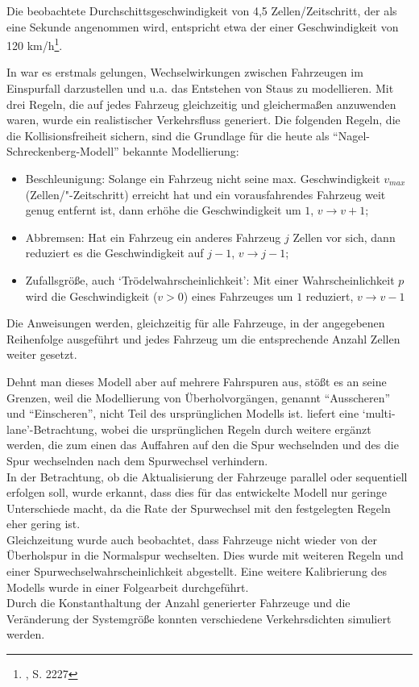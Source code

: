 Die beobachtete Durchschittsgeschwindigkeit von 4,5 Zellen/Zeitschritt, der als eine Sekunde angenommen wird, entspricht etwa der einer Geschwindigkeit von 120 km/h\footnote{\cite{na-sch}, S. 2227}. 

In \cite{na-sch} war es erstmals gelungen, Wechselwirkungen zwischen Fahrzeugen im Einspurfall darzustellen %
und u.a. das Entstehen von Staus zu modellieren. 
Mit drei Regeln, die auf jedes Fahrzeug gleichzeitig und gleichermaßen anzuwenden waren, wurde ein realistischer Verkehrsfluss generiert. 
Die folgenden Regeln, die die Kollisionsfreiheit sichern, sind die Grundlage für die heute als \enquote{Nagel-Schreckenberg-Modell} bekannte Modellierung: 

\begin{itemize}
\item Beschleunigung: Solange ein Fahrzeug nicht seine max. Geschwindigkeit $v_{max}$ (Zellen/"-Zeitschritt) erreicht hat und ein vorausfahrendes Fahrzeug weit genug entfernt ist, dann erhöhe die Geschwindigkeit um $1$, $v \rightarrow v+1$;
\item Abbremsen: Hat ein Fahrzeug ein anderes Fahrzeug $j$ Zellen vor sich, dann reduziert es die Geschwindigkeit auf $j-1$, $v \rightarrow j-1$;
\item Zufallsgröße, auch \enquote*{Trödelwahrscheinlichkeit}: Mit einer Wahrscheinlichkeit $p$ wird die Geschwindigkeit ($v > 0$) eines Fahrzeuges um $1$ reduziert, $v \rightarrow v-1$
\end{itemize}

Die Anweisungen werden, gleichzeitig für alle Fahrzeuge, in der angegebenen Reihenfolge ausgeführt und jedes Fahrzeug um die entsprechende Anzahl Zellen weiter gesetzt.

Dehnt man dieses Modell aber auf mehrere Fahrspuren aus, stößt es an seine Grenzen, weil die Modellierung von Überholvorgängen, genannt \enquote{Ausscheren} und \enquote{Einscheren}, nicht Teil des ursprünglichen Modells ist. 
\cite{multi-lane} liefert eine \enquote*{multi-lane}-Betrachtung, wobei die ursprünglichen Regeln durch weitere ergänzt werden, die zum einen das Auffahren auf den die Spur wechselnden und des die Spur wechselnden nach dem Spurwechsel verhindern. \\
In der Betrachtung, ob die Aktualisierung der Fahrzeuge parallel oder sequentiell erfolgen soll, wurde erkannt, dass dies für das entwickelte Modell nur geringe Unterschiede macht, da die Rate der Spurwechsel mit den festgelegten Regeln eher gering ist. \\
Gleichzeitung wurde auch beobachtet, dass Fahrzeuge nicht wieder von der Überholspur in die Normalspur wechselten. Dies wurde mit weiteren Regeln und einer Spurwechselwahrscheinlichkeit abgestellt. Eine weitere Kalibrierung des Modells wurde in einer Folgearbeit durchgeführt. \\
Durch die Konstanthaltung der Anzahl generierter Fahrzeuge und die Veränderung der Systemgröße konnten verschiedene Verkehrsdichten simuliert werden.

